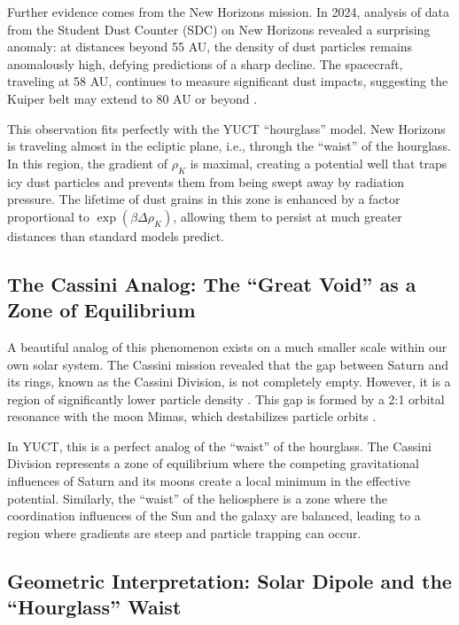 \documentclass[12pt,a4paper]{article}
\theoremstyle{remark}
\begin{document}
	Further evidence comes from the New Horizons mission. In 2024, analysis of data from the Student Dust Counter (SDC) on New Horizons revealed a surprising anomaly: at distances beyond 55 AU, the density of dust particles remains anomalously high, defying predictions of a sharp decline. The spacecraft, traveling at 58 AU, continues to measure significant dust impacts, suggesting the Kuiper belt may extend to 80 AU or beyond .
	
	This observation fits perfectly with the YUCT ``hourglass'' model. New Horizons is traveling almost in the ecliptic plane, i.e., through the ``waist'' of the hourglass. In this region, the gradient of \(\rho_K\) is maximal, creating a potential well that traps icy dust particles and prevents them from being swept away by radiation pressure. The lifetime of dust grains in this zone is enhanced by a factor proportional to \(\exp(\beta \Delta \rho_K)\), allowing them to persist at much greater distances than standard models predict.
	
	\subsection{The Cassini Analog: The ``Great Void'' as a Zone of Equilibrium}
	\label{subsec:coord:cassini}
	
	A beautiful analog of this phenomenon exists on a much smaller scale within our own solar system. The Cassini mission revealed that the gap between Saturn and its rings, known as the Cassini Division, is not completely empty. However, it is a region of significantly lower particle density . This gap is formed by a 2:1 orbital resonance with the moon Mimas, which destabilizes particle orbits .
	
	In YUCT, this is a perfect analog of the ``waist'' of the hourglass. The Cassini Division represents a zone of equilibrium where the competing gravitational influences of Saturn and its moons create a local minimum in the effective potential. Similarly, the ``waist'' of the heliosphere is a zone where the coordination influences of the Sun and the galaxy are balanced, leading to a region where gradients are steep and particle trapping can occur.
	
	\subsection{Geometric Interpretation: Solar Dipole and the ``Hourglass'' Waist}
	\label{subsec:coord:dipole_geometry}
	
\end{document}
